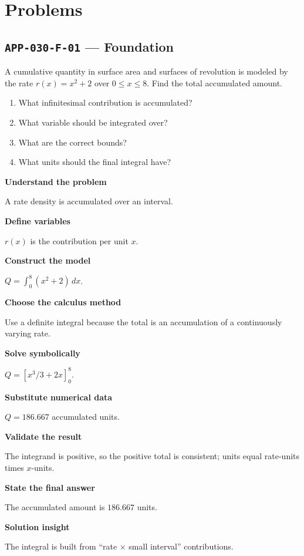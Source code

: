 \documentclass[11pt]{book}
\newcommand{\pid}[1]{\texttt{#1}}
\begin{document}
\section*{Problems}
\subsection*{\pid{APP-030-F-01} — Foundation}
\begin{problembox}
A cumulative quantity in surface area and surfaces of revolution is modeled by the rate $r(x)=x^2+2$ over $0\le x\le 8$. Find the total accumulated amount.
\end{problembox}
\begin{promptbox}\begin{enumerate}
\item What infinitesimal contribution is accumulated?
\item What variable should be integrated over?
\item What are the correct bounds?
\item What units should the final integral have?
\end{enumerate}\end{promptbox}
\begin{solutionbox}
\textbf{Understand the problem}\par A rate density is accumulated over an interval.\par\medskip
\textbf{Define variables}\par $r(x)$ is the contribution per unit $x$.\par\medskip
\textbf{Construct the model}\par $Q=\int_0^{8}(x^2+2)\,dx$.\par\medskip
\textbf{Choose the calculus method}\par Use a definite integral because the total is an accumulation of a continuously varying rate.\par\medskip
\textbf{Solve symbolically}\par $Q=[x^3/3+2x]_0^{8}$.\par\medskip
\textbf{Substitute numerical data}\par $Q=186.667$ accumulated units.\par\medskip
\textbf{Validate the result}\par The integrand is positive, so the positive total is consistent; units equal rate-units times $x$-units.\par\medskip
\textbf{State the final answer}\par The accumulated amount is $186.667$ units.\par\medskip
\textbf{Solution insight}\par The integral is built from “rate × small interval” contributions.\par\medskip
\end{solutionbox}
\end{document}
